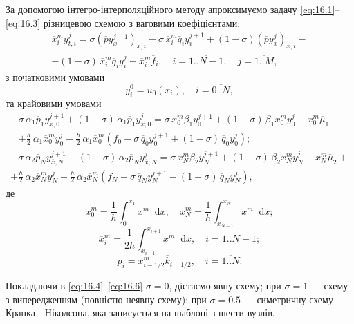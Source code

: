 \documentclass[12pt, a4paper]{article}
\newcommand{\ol}[1]{\overline{#1}}
\newcommand{\range}[2]{\ol{#1..#2}}
\newcommand*\diff{\mathop{}\!\mathrm{d}}
\begin{document}
За допомогою інтегро-інтерполяційного методу апроксимуємо задачу \eqref{eq:16.1}--\eqref{eq:16.3} різницевою схемою з ваговими коефіцієнтами:
\begin{multline}
    \label{eq:16.4}
    \ol x_i^m y_{t, i}^j = \sigma \left( \ol p y_x^{j + 1} \right)_{x, i} - \sigma \, \ol x_i^m \ol q_i y_i^{j + 1} + (1 - \sigma) \left( \ol p y_x^j \right)_{x, i} - \\ - (1 - \sigma) \, \ol x_i^m \ol q_i y_i^j + \ol x_i^m \ol f_i, \quad i = \range{1}{N - 1}, \quad j = \range{1}{M},
\end{multline}
з початковими умовами
\begin{equation*}
    y_i^0 = u_0(x_i), \quad i = \range{0}{N},
\end{equation*}
та крайовими умовами
\begin{multline}
    \label{eq:16.5}
    \sigma \, \alpha_1 \ol p_1 y_{\ol x, 0}^{j + 1} + (1 - \sigma) \, \alpha_1 \ol p_1 y_{\ol x, 0}^j = \sigma \, x_0^m \beta_1 y_0^{j + 1} + (1 - \sigma) \, \beta_1 x_0^m y_0^j - x_0^m \ol \mu_1 + \\ + \frac{h}{2} \, \alpha_1 \ol x_0^m y_0^j - \frac{h}{2} \, \alpha_1 \ol x_0^m \left( \ol f_0 - \sigma \, \ol q_0 y_0^{j + 1} + (1 - \sigma) \, \ol q_0 y_0^j \right);
\end{multline}
\begin{multline}
    \label{eq:16.6}
    -\sigma \, \alpha_2 \ol p_N y_{\ol x, N}^{j + 1} - (1 - \sigma) \, \alpha_2 \ol p_N y_{\ol x, N}^j = \sigma \, x_N^m \beta_2 y_N^{j + 1} + (1 - \sigma) \, \beta_2 x_N^m y_N^j - x_N^m \ol \mu_2 + \\ + \frac{h}{2} \, \alpha_2 \ol x_N^m y_N^j - \frac{h}{2} \, \alpha_2 \ol x_N^m \left( \ol f_N - \sigma \, \ol q_N y_N^{j + 1} - (1 - \sigma) \, \ol q_N y_N^j \right),
\end{multline}
де
\begin{equation*}
    \ol x_0^m = \frac{1}{h} \int_0^{x_1} x^m \diff x; \quad \ol x_N^m = \frac{1}{h} \int_{x_{N - 1}}^{x_N} x^m \diff x;
\end{equation*}
\begin{equation*}
    \ol x_i^m = \frac{1}{2h} \int_{x_{i - 1}}^{x_{i + 1}} x^m \diff x, \quad i = \range{1}{N - 1};
\end{equation*}
\begin{equation*}
    \ol p_i = x_{i - 1/2}^m \ol k_{i - 1/2}, \quad i = \range{1}{N}.
\end{equation*}

Покладаючи в \eqref{eq:16.4}--\eqref{eq:16.6} $\sigma = 0$, дістаємо явну схему; при $\sigma = 1$ --- схему з випередженням (повністю неявну схему); при $\sigma = 0.5$ --- симетричну схему Кранка---Ніколсона, яка записується на шаблоні з шести вузлів. \medskip
\end{document}
